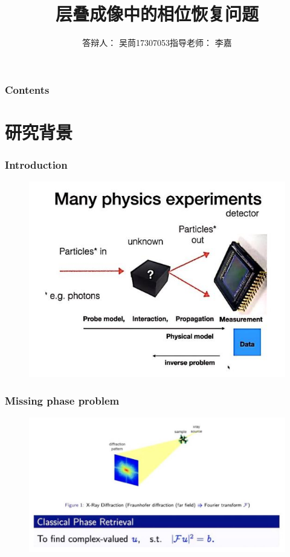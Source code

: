 \documentclass[UTF8]{beamer}
\author{答辩人： 吴茼17307053\quad 指导老师： 李嘉}
\title{层叠成像中的相位恢复问题}
\institute{中山大学数学学院\quad 数学与应用数学专业}
\begin{document}
\frame{\titlepage}

\begin{frame} \frametitle{Contents}
\tableofcontents
\end{frame}

\section{研究背景}


\begin{frame} \frametitle{Introduction}
\begin{figure}[H]
\centering

    \includegraphics[width=1\linewidth]{../figures0/overall.jpg}  
   
\end{figure}
\end{frame}

\begin{frame} \frametitle{Missing phase problem}
\begin{figure}[H]
\centering

    \includegraphics[width=1\linewidth]{../figures0/problem.jpg}  
   
\end{figure}
\end{frame}
\end{document}
